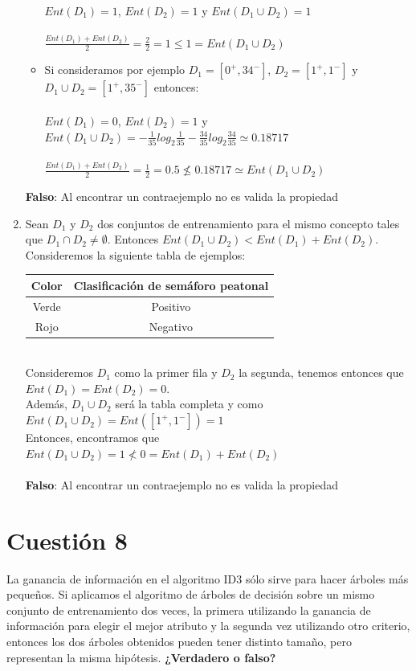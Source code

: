 \documentclass{article}
\begin{document}
\begin{enumerate}
\begin{itemize}
    $Ent(D_1)=1$, $Ent(D_2)=1$ y $Ent(D_1 \cup D_2)= 1$\\\\
    $\frac{Ent(D_1)+Ent(D_2)}{2} = \frac{2}{2}= 1 \leq 1 = Ent(D_1\cup D_2)$
    \item Si consideramos por ejemplo $D_1 = [0^+,34^-]$, $D_2 = [1^+,1^-]$ y $D_1 \cup D_2 = [1^+,35^-]$ entonces:\\\\
    $Ent(D_1)=0$, $Ent(D_2)=1$ y $Ent(D_1 \cup D_2)= -\frac{1}{35}log_2\frac{1}{35}-\frac{34}{35}log_2\frac{34}{35}\simeq0.18717$\\\\
    $\frac{Ent(D_1)+Ent(D_2)}{2} = \frac{1}{2} = 0.5 \nleq 0.18717 \simeq Ent(D_1\cup D_2)$
    \end{itemize}
    
    \textbf{Falso}: Al encontrar un contraejemplo no es valida la propiedad
    
    \item Sean $D_1$ y $D_2$ dos conjuntos de entrenamiento para el mismo concepto tales que $D_1 \cap D_2 \not = \emptyset$. Entonces $Ent(D_1 \cup D_2) < Ent(D_1) + Ent(D_2)$.\\
    
    Consideremos la siguiente tabla de ejemplos:
    \begin{flushleft}
    \begin{tabular}{||c | c ||}
    \hline
    Color    & Clasificación de semáforo peatonal\\ \hline
    Verde    & Positivo \\ 
    Rojo     & Negativo \\ \hline
    \end{tabular}
    \end{flushleft}\\
    Consideremos $D_1$ como la primer fila y $D_2$ la segunda, tenemos entonces que $Ent(D_1)=Ent(D_2) = 0$.\\
    Además, $D_1 \cup D_2$ será la tabla completa y como $Ent(D_1 \cup D_2) = Ent([1^+, 1^-]) = 1$\\
    Entonces, encontramos que $Ent(D_1 \cup D_2) = 1 \nless 0 = Ent(D_1) + Ent(D_2)$\\\\
    \textbf{Falso}: Al encontrar un contraejemplo no es valida la propiedad
    \end{enumerate}


\section*{Cuestión 8}
La ganancia de información en el algoritmo ID3 sólo sirve para hacer árboles más pequeños. Si aplicamos el algoritmo de árboles de decisión sobre un mismo conjunto de entrenamiento dos veces, la primera utilizando la ganancia de información para elegir el mejor atributo y la segunda vez utilizando otro criterio, entonces los dos árboles obtenidos pueden tener distinto tamaño, pero representan la misma hipótesis. \textbf{¿Verdadero o falso?}\\
\end{document}
